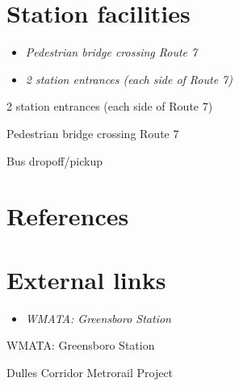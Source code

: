 \section{Station facilities}\label{station-facilities}

\begin{itemize}
\item
  \emph{Pedestrian bridge crossing Route 7}
\item
  \emph{2 station entrances (each side of Route 7)}
\end{itemize}

2 station entrances (each side of Route 7)

Pedestrian bridge crossing Route 7

Bus dropoff/pickup

\section{References}\label{references}

\section{External links}\label{external-links}

\begin{itemize}
\item
  \emph{WMATA: Greensboro Station}
\end{itemize}

WMATA: Greensboro Station

Dulles Corridor Metrorail Project
